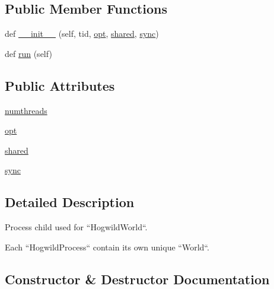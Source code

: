 \subsection*{Public Member Functions}
\begin{DoxyCompactItemize}
\item 
def \hyperlink{classparlai_1_1core_1_1worlds_1_1HogwildProcess_a8356a8de17d41e86e4da0262fc5d36d7}{\+\_\+\+\_\+init\+\_\+\+\_\+} (self, tid, \hyperlink{classparlai_1_1core_1_1worlds_1_1HogwildProcess_a640d8da3bcea07a0748b8973f390f125}{opt}, \hyperlink{classparlai_1_1core_1_1worlds_1_1HogwildProcess_a614b61613d85c80764b8b68697697e13}{shared}, \hyperlink{classparlai_1_1core_1_1worlds_1_1HogwildProcess_a7bf5f7806e93a6b1ecb02fd12fa4a01f}{sync})
\item 
def \hyperlink{classparlai_1_1core_1_1worlds_1_1HogwildProcess_a749caf3085cb7b373db66b6f92567290}{run} (self)
\end{DoxyCompactItemize}
\subsection*{Public Attributes}
\begin{DoxyCompactItemize}
\item 
\hyperlink{classparlai_1_1core_1_1worlds_1_1HogwildProcess_a4266e7c47686cd9b4fa9d62ae84375c8}{numthreads}
\item 
\hyperlink{classparlai_1_1core_1_1worlds_1_1HogwildProcess_a640d8da3bcea07a0748b8973f390f125}{opt}
\item 
\hyperlink{classparlai_1_1core_1_1worlds_1_1HogwildProcess_a614b61613d85c80764b8b68697697e13}{shared}
\item 
\hyperlink{classparlai_1_1core_1_1worlds_1_1HogwildProcess_a7bf5f7806e93a6b1ecb02fd12fa4a01f}{sync}
\end{DoxyCompactItemize}


\subsection{Detailed Description}
\begin{DoxyVerb}Process child used for ``HogwildWorld``.

Each ``HogwildProcess`` contain its own unique ``World``.
\end{DoxyVerb}
 

\subsection{Constructor \& Destructor Documentation}
\mbox{\label{classparlai_1_1core_1_1worlds_1_1HogwildProcess_a8356a8de17d41e86e4da0262fc5d36d7}} 
